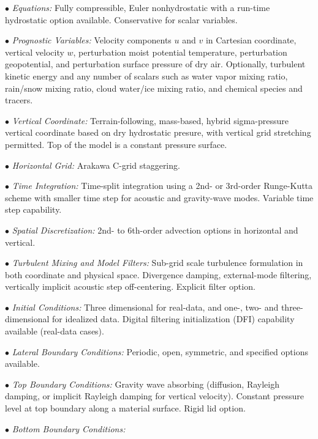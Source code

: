 \begin{description}
\setlength{\itemsep}{-5pt}
\item{$\bullet$} {\em Equations:}
Fully compressible, Euler nonhydrostatic with 
a run-time hydrostatic option available. Conservative for scalar variables.
%
\item{$\bullet$} {\em Prognostic Variables:}
Velocity components $u$ and $v$ in Cartesian coordinate, vertical velocity $w$, 
perturbation moist potential temperature, perturbation geopotential, 
and perturbation surface pressure of dry air.
Optionally, turbulent kinetic energy and any number of scalars
such as water vapor mixing ratio, rain/snow mixing ratio,
cloud water/ice mixing ratio, and chemical species and tracers.
%
\item{$\bullet$} {\em Vertical Coordinate:}
Terrain-following, mass-based, hybrid sigma-pressure vertical coordinate based on dry hydrostatic presure, 
with vertical grid stretching permitted.
Top of the model is a constant pressure surface.
%
\item{$\bullet$} {\em Horizontal Grid:}
Arakawa C-grid staggering. 
%
\item{$\bullet$} {\em Time Integration:}
Time-split integration using a 2nd- or 3rd-order Runge-Kutta scheme with
smaller time step for acoustic and gravity-wave modes. 
Variable time step capability.
%
\item{$\bullet$} {\em Spatial Discretization:}
2nd- to 6th-order advection options in horizontal and vertical.
%
\item{$\bullet$} {\em Turbulent Mixing and Model Filters:} Sub-grid scale
turbulence formulation in both coordinate and physical space.
Divergence damping, external-mode filtering, vertically implicit
acoustic step off-centering. Explicit filter option.
%
\item{$\bullet$} {\em Initial Conditions:}
Three dimensional for real-data, and one-, two- and 
three-dimensional for idealized data. 
Digital filtering initialization (DFI) capability 
available (real-data cases).
%
\item{$\bullet$} {\em Lateral Boundary Conditions:} 
Periodic, open, symmetric, and specified options available.
%
\item{$\bullet$} {\em Top Boundary Conditions:} 
Gravity wave absorbing (diffusion, Rayleigh damping, or implicit 
Rayleigh damping for vertical velocity).  
Constant pressure level at top boundary along a material surface. 
Rigid lid option.
%
\item{$\bullet$} {\em Bottom Boundary Conditions:} 

\end{description}
